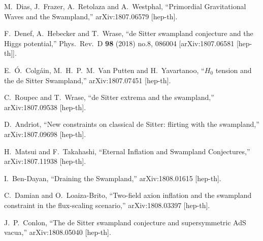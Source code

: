 \documentclass[11pt,a4paper]{article}
\begin{document}
\begin{thebibliography}{99}
  M.~Dias, J.~Frazer, A.~Retolaza and A.~Westphal,
  ``Primordial Gravitational Waves and the Swampland,''
  arXiv:1807.06579 [hep-th].

  F.~Denef, A.~Hebecker and T.~Wrase,
  ``de Sitter swampland conjecture and the Higgs potential,''
  Phys.\ Rev.\ D {\bf 98} (2018) no.8,  086004
  [arXiv:1807.06581 [hep-th]].


  E.~Ó.~Colgáin, M.~H.~P.~M.~Van Putten and H.~Yavartanoo,
  ``$H_0$ tension and the de Sitter Swampland,''
  arXiv:1807.07451 [hep-th].


  C.~Roupec and T.~Wrase,
  ``de Sitter extrema and the swampland,''
  arXiv:1807.09538 [hep-th].


  D.~Andriot,
  ``New constraints on classical de Sitter: flirting with the swampland,''
  arXiv:1807.09698 [hep-th].


  H.~Matsui and F.~Takahashi,
  ``Eternal Inflation and Swampland Conjectures,''
  arXiv:1807.11938 [hep-th].


  I.~Ben-Dayan,
  ``Draining the Swampland,''
  arXiv:1808.01615 [hep-th].


  C.~Damian and O.~Loaiza-Brito,
  ``Two-field axion inflation and the swampland constraint in the flux-scaling scenario,''
  arXiv:1808.03397 [hep-th].


  J.~P.~Conlon,
  ``The de Sitter swampland conjecture and supersymmetric AdS vacua,''
  arXiv:1808.05040 [hep-th].



\end{thebibliography}
\end{document}
